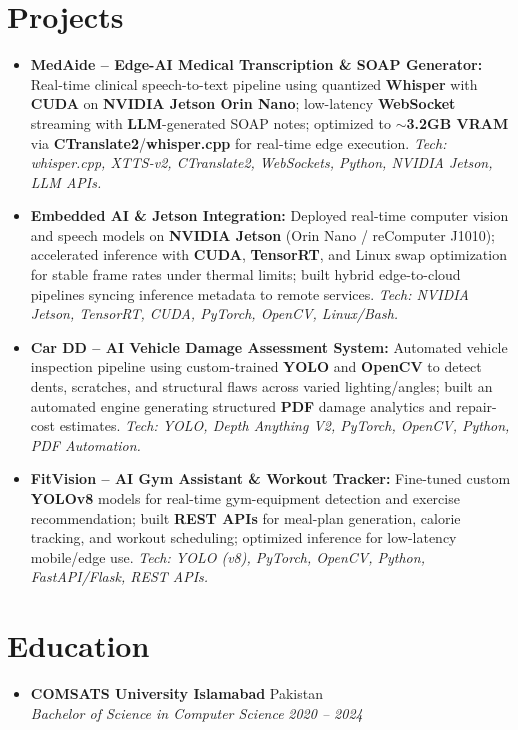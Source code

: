 \documentclass[10pt,letterpaper]{article}
\begin{document}
\section{Projects}
\begin{itemize}
    \item \textbf{MedAide -- Edge-AI Medical Transcription \& SOAP Generator:} Real-time clinical speech-to-text pipeline using quantized \textbf{Whisper} with \textbf{CUDA} on \textbf{NVIDIA Jetson Orin Nano}; low-latency \textbf{WebSocket} streaming with \textbf{LLM}-generated SOAP notes; optimized to $\sim$\textbf{3.2GB VRAM} via \textbf{CTranslate2}/\textbf{whisper.cpp} for real-time edge execution. \textit{Tech: whisper.cpp, XTTS-v2, CTranslate2, WebSockets, Python, NVIDIA Jetson, LLM APIs.}
    
    \vspace{3pt}
    \item \textbf{Embedded AI \& Jetson Integration:} Deployed real-time computer vision and speech models on \textbf{NVIDIA Jetson} (Orin Nano / reComputer J1010); accelerated inference with \textbf{CUDA}, \textbf{TensorRT}, and Linux swap optimization for stable frame rates under thermal limits; built hybrid edge-to-cloud pipelines syncing inference metadata to remote services. \textit{Tech: NVIDIA Jetson, TensorRT, CUDA, PyTorch, OpenCV, Linux/Bash.}
    
    \vspace{3pt}
    \item \textbf{Car DD -- AI Vehicle Damage Assessment System:} Automated vehicle inspection pipeline using custom-trained \textbf{YOLO} and \textbf{OpenCV} to detect dents, scratches, and structural flaws across varied lighting/angles; built an automated engine generating structured \textbf{PDF} damage analytics and repair-cost estimates. \textit{Tech: YOLO, Depth Anything V2, PyTorch, OpenCV, Python, PDF Automation.}
    
    \vspace{3pt}
    \item \textbf{FitVision -- AI Gym Assistant \& Workout Tracker:} Fine-tuned custom \textbf{YOLOv8} models for real-time gym-equipment detection and exercise recommendation; built \textbf{REST APIs} for meal-plan generation, calorie tracking, and workout scheduling; optimized inference for low-latency mobile/edge use. \textit{Tech: YOLO (v8), PyTorch, OpenCV, Python, FastAPI/Flask, REST APIs.}
\end{itemize}

\section{Education}
\begin{itemize}
    \item \textbf{COMSATS University Islamabad} \hfill Pakistan \\
    \textit{Bachelor of Science in Computer Science} \hfill \textit{2020 -- 2024}
\end{itemize}
\end{document}

